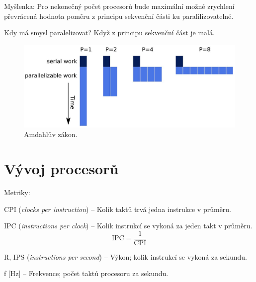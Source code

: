 \begin{compactitem}
\begin{compactitem}
        \item Myšlenka: Pro nekonečný počet procesorů bude maximální možné zrychlení převrácená hodnota poměru z principu sekvenční části ku paralilizovatelné.

        \item Kdy má smysl paralelizovat? Když z principu sekvenční část je malá.

        \begin{figure}[H]
            \centering
            \includegraphics[width=1\linewidth]{amdahl.png}
            \caption{Amdahlův zákon.}
        \end{figure}
    \end{compactitem}

\end{compactitem}


\section{Vývoj procesorů}

\begin{compactitem}
    \item Metriky: \begin{compactitem}
        \item CPI (\textit{clocks per instruction}) -- Kolik taktů trvá jedna instrukce v průměru.

        \item IPC (\textit{instructions per clock}) -- Kolik instrukcí se vykoná za jeden takt v průměru.
        $$ \text{IPC} = \frac{1}{\text{CPI}} $$

        \item R, IPS (\textit{instructions per second}) -- Výkon; kolik instrukcí se vykoná za sekundu.

        \item f [Hz] -- Frekvence; počet taktů procesoru za sekundu.
    \end{compactitem}
\end{compactitem}

